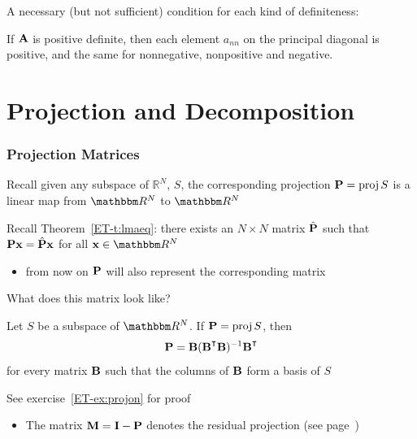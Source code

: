 \begin{frame}

     \vspace{2em}
    A necessary (but not sufficient) condition for each kind of definiteness:
    
    \vspace{.7em}
    \Fact{\eqref{ET-fa:ipde0}}
        If $\mathbf A$ is positive definite, then
        each element $a_{nn}$ on the principal diagonal is positive, and the same
        for nonnegative, nonpositive and negative.
        
\end{frame}

\section{Projection and Decomposition}

\begin{frame}\frametitle{Projection Matrices}

     \vspace{2em}
    Recall given any subspace of $\mathbb{R}^{N}$, $S$, the corresponding
    projection $\mathbf P = \operatorname{proj} S$ is a linear map from $\RR^N$ to $\RR^N$

    \vspace{.7em}
    Recall Theorem~\ref{ET-t:lmaeq}: there exists an $N \times N$ matrix $\hat {\mathbf P}$ such that $\mathbf P {\mathbf x} =
    \hat {\mathbf P} {\mathbf x}$ for all $\boldx \in \RR^N$
    \begin{itemize}
        \item from now on $\mathbf P$ will also represent
    the corresponding matrix
    \end{itemize} 
    
    What does this matrix look like?
    
\end{frame}

\begin{frame}

     \vspace{.7em}
    \Thm {\eqref{ET-t:projon}}
    Let $S$ be a subspace of $\RR^N$.  If $\mathbf P = \operatorname{proj} S$, then
    \begin{equation}
        \label{eq:projb}
        \boldP = \boldB (\boldB^\T\boldB)^{-1} \boldB^\T  
    \end{equation}
    for every matrix $\mathbf B$ such that the columns of $\mathbf B$ form a basis
    of $S$ 
    
    \vspace{.7em}
    See exercise~\ref{ET-ex:projon} for proof
    
    \begin{itemize}
        \item  The matrix $\mathbf M = \mathbf I -
                \mathbf P$ denotes the residual projection (see page~\pageref{ET-eq:ann0})
    \end{itemize}
    
\end{frame}

